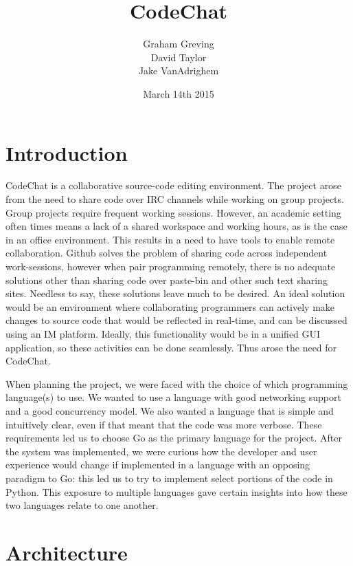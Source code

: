 \documentclass[12pt, letterpaper]{article}
\title{CodeChat}
\author{Graham Greving \\ David Taylor \\ Jake VanAdrighem}
\date{March 14th 2015}
\begin{document}
\maketitle

\section*{Introduction}


CodeChat is a collaborative source-code editing environment. The 
project arose from the need to share code over IRC channels while 
working on group projects. Group projects require frequent working 
sessions. However, an academic setting often times means a lack of a 
shared workspace and working hours, as is the case in an office 
environment. This results in a need to have tools to enable remote 
collaboration. Github solves the problem of sharing code across 
independent work-sessions, however when pair programming remotely, 
there is no adequate solutions other than sharing code over paste-bin 
and other such text sharing sites. Needless to say, these solutions 
leave much to be desired. An ideal solution would be an environment 
where collaborating programmers can actively make changes to source 
code that would be reflected in real-time, and can be discussed using 
an IM platform. Ideally, this functionality would be in a unified GUI 
application, so these activities can be done seamlessly. Thus arose the
need for CodeChat.


When planning the project, we were faced with the choice of which
programming language(s) to use. We wanted to use a language with good
networking support and a good concurrency model. We also wanted a
language that is simple and intuitively clear, even if that meant that
the code was more verbose. These requirements led us to choose Go as
the primary language for the project. After the system was implemented,
we were curious how the developer and user experience would change if
implemented in a language with an opposing paradigm to Go: this led us
to try to implement select portions of the code in Python. This
exposure to multiple languages gave certain insights into how these two
languages relate to one another.

\section*{Architecture}
\end{document}
